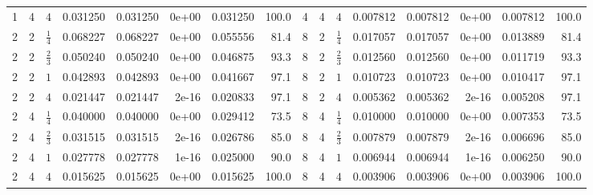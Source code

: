 \begin{table}[t]
\begin{tabular}{@{}rrrrrrrr@{\hspace{10pt}}|@{\hspace{10pt}}rrrrrrrr@{}}
1 & 4 & $4$ & 0.031250 & 0.031250 & 0e+00 & 0.031250 & 100.0 & 4 & 4 & $4$ & 0.007812 & 0.007812 & 0e+00 & 0.007812 & 100.0 \\
2 & 2 & $\frac14$ & 0.068227 & 0.068227 & 0e+00 & 0.055556 & 81.4 & 8 & 2 & $\frac14$ & 0.017057 & 0.017057 & 0e+00 & 0.013889 & 81.4 \\
2 & 2 & $\frac23$ & 0.050240 & 0.050240 & 0e+00 & 0.046875 & 93.3 & 8 & 2 & $\frac23$ & 0.012560 & 0.012560 & 0e+00 & 0.011719 & 93.3 \\
2 & 2 & $1$ & 0.042893 & 0.042893 & 0e+00 & 0.041667 & 97.1 & 8 & 2 & $1$ & 0.010723 & 0.010723 & 0e+00 & 0.010417 & 97.1 \\
2 & 2 & $4$ & 0.021447 & 0.021447 & 2e-16 & 0.020833 & 97.1 & 8 & 2 & $4$ & 0.005362 & 0.005362 & 2e-16 & 0.005208 & 97.1 \\
2 & 4 & $\frac14$ & 0.040000 & 0.040000 & 0e+00 & 0.029412 & 73.5 & 8 & 4 & $\frac14$ & 0.010000 & 0.010000 & 0e+00 & 0.007353 & 73.5 \\
2 & 4 & $\frac23$ & 0.031515 & 0.031515 & 2e-16 & 0.026786 & 85.0 & 8 & 4 & $\frac23$ & 0.007879 & 0.007879 & 2e-16 & 0.006696 & 85.0 \\
2 & 4 & $1$ & 0.027778 & 0.027778 & 1e-16 & 0.025000 & 90.0 & 8 & 4 & $1$ & 0.006944 & 0.006944 & 1e-16 & 0.006250 & 90.0 \\
2 & 4 & $4$ & 0.015625 & 0.015625 & 0e+00 & 0.015625 & 100.0 & 8 & 4 & $4$ & 0.003906 & 0.003906 & 0e+00 & 0.003906 & 100.0 \\
\bottomrule
\end{tabular}
\end{table}
